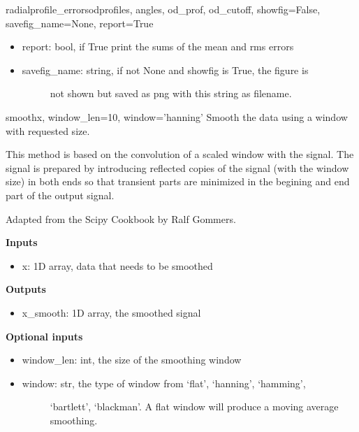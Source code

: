 \documentclass[letterpaper,10pt,english]{manual}
\begin{document}
\begin{funcdesc}{radialprofile\_errors}{odprofiles, angles, od\_prof, od\_cutoff, showfig=False, savefig\_name=None, report=True}
\begin{itemize}
\begin{description}
\end{description}

\item {} 
report: bool, if True print the sums of the mean and rms errors

\item {} \begin{description}
\item[savefig\_name: string, if not None and showfig is True, the figure is] \leavevmode
not shown but saved as png with this string as filename.

\end{description}

\end{itemize}
\end{funcdesc}

\hypertarget{odysseus.imageprocess.smooth}{}\begin{funcdesc}{smooth}{x, window\_len=10, window='hanning'}
Smooth the data using a window with requested size.

This method is based on the convolution of a scaled window with the signal.
The signal is prepared by introducing reflected copies of the signal
(with the window size) in both ends so that transient parts are minimized
in the begining and end part of the output signal.

Adapted from the Scipy Cookbook by Ralf Gommers.

\textbf{Inputs}
\begin{itemize}
\item {} 
x: 1D array, data that needs to be smoothed

\end{itemize}

\textbf{Outputs}
\begin{itemize}
\item {} 
x\_smooth: 1D array, the smoothed signal

\end{itemize}

\textbf{Optional inputs}
\begin{itemize}
\item {} 
window\_len: int, the size of the smoothing window

\item {} \begin{description}
\item[window: str, the type of window from `flat', `hanning', `hamming',] \leavevmode
`bartlett', `blackman'. A flat window will produce a
moving average smoothing.

\end{description}

\end{itemize}
\end{funcdesc}
\end{document}
